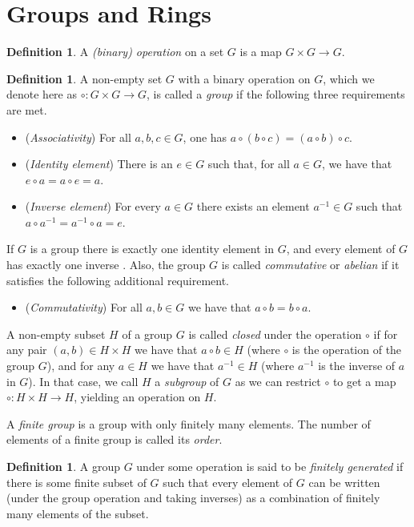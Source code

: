 \documentclass[openany, a4paper, 10pt]{book}
\theoremstyle{plain}
\theoremstyle{plain}
\theoremstyle{plain}
\theoremstyle{definition}
\newtheorem{definition}[theorem]{Definition}
\theoremstyle{plain}
\theoremstyle{definition}
\theoremstyle{remark}
\begin{document}
\section{Groups and Rings}
\begin{definition}
    A \textit{(binary) operation} on a set $G$ is a map $G \times G \to G$.
\end{definition}
\begin{definition}\label{is_a_group}
    A non-empty set $G$ with a binary operation on $G$, which we denote here as $\circ: G\times G \to G$, is called a \textit{group} if the following three requirements are met.
    \begin{itemize}
        \item (\textit{Associativity}) For all $a,b,c \in G$, one has $a \circ (b \circ c) = (a \circ b) \circ c$.
        \item (\textit{Identity element}) There is an $e \in G$ such that, for all $a \in G$, we have that $e \circ a = a \circ e = a$.
        \item (\textit{Inverse element}) For every $a \in G$ there exists an element $a^{-1} \in G$ such that $a \circ a^{-1} = a^{-1} \circ a = e$.
    \end{itemize}
    If $G$ is a group there is exactly one identity element in $G$, and every element of $G$ has exactly one inverse \cite[Theorem~2.4]{dictaat_dion}.
    Also, the group $G$ is called \textit{commutative} or \textit{abelian} if it satisfies the following additional requirement.
    \begin{itemize}
        \item (\textit{Commutativity}) For all $a,b \in G$ we have that $a \circ b = b \circ a$.
    \end{itemize}
    A non-empty subset $H$ of a group $G$ is called \textit{closed} under the operation $\circ$ if for any pair $(a, b) \in H \times H$ we have that $a \circ b \in H$ (where $\circ$ is the operation of the group $G$), and for any $a \in H$ we have that $a^{-1} \in H$ (where $a^{-1}$ is the inverse of $a$ in $G$).
    In that case, we call $H$ a \textit{subgroup} of $G$ as we can restrict $\circ$ to get a map $\circ: H \times H \to H$, yielding an operation on $H$.

    A \textit{finite group} is a group with only finitely many elements.
    The number of elements of a finite group is called its \textit{order}.
\end{definition}
\begin{definition}\label{fin_generated}
    A group $G$ under some operation is said to be \textit{finitely generated} if there is some finite subset of $G$ such that every element of $G$ can be written (under the group operation and taking inverses) as a combination of finitely many elements of the subset.
\end{definition}
\end{document}
